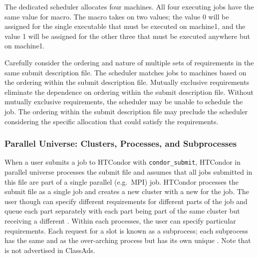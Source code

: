 The dedicated scheduler allocates four machines.
All four executing jobs have the same value for 
macro.
The  macro takes on two values;
the value 0 will be assigned for the single executable
that must be executed on machine1, and
the value 1 will be assigned for the other three 
that must be executed anywhere but on machine1.

Carefully consider the ordering and nature of multiple
sets of requirements in the same submit description file.
The scheduler matches jobs to machines based on the ordering
within the submit description file.
Mutually exclusive requirements eliminate the dependence on
ordering within the submit description file.
Without mutually exclusive requirements,
the scheduler may be unable to schedule the job.
The ordering within the submit description file may preclude
the scheduler considering the specific allocation that
could satisfy the requirements.


\subsubsection{\label{sec:Configure-Clusters-Processes-Subprocesses}
Parallel Universe: Clusters, Processes, and Subprocesses} 

When 
a user submits a job to HTCondor with \verb=condor_submit=, HTCondor in parallel 
universe processes the submit file and assumes that all jobs submitted in this 
file are part of a single parallel (e.g.~MPI) job. HTCondor processes the submit 
file as a single job and
creates a new cluster with a new  for the job. The user though can 
specify different requirements for different parts of the job and queue each 
part separately with each part being part of the same cluster but receiving a 
different . Within each processes, the user can specify particular
requirements.
Each request for a slot is known as a subprocess; each subprocess has the same 
 and  as the over-arching process but has its 
own unique 
. Note that  is not advertised in ClassAds.


